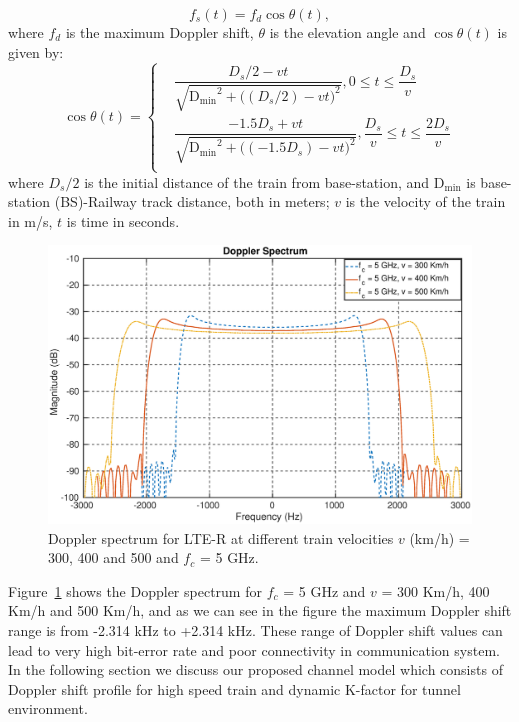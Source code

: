 \begin{equation}
\label{eq1}
f_s(t) = f_d\cos\theta(t),
\end{equation}
where \textrm{$f_d$} is the maximum Doppler shift, $\theta$ is the elevation angle and $\cos \theta(t)$ is given by:
\begin{equation}
\cos\theta(t) = 
\left\{
	\begin{aligned}
	 & \dfrac{D_s/2-vt}{\sqrt{\mathrm{D_{min}}^2+\bigg((D_s/2)-vt\bigg)^2}},0\leq t\leq\dfrac{D_s}{v}\\
	 & \dfrac{-1.5D_s+vt}{\sqrt{\mathrm{D_{min}}^2+\bigg((-1.5D_s)-vt\bigg)^2}},\dfrac{D_s}{v}\leq t \leq \dfrac{2D_s}{v}\\
 	\end{aligned}
\right.
\end{equation}
where $D_s/2$ is the initial distance of the train from base-station, and $\mathrm{D_{min}}$ is base-station (BS)-Railway track distance, both in meters; $v$ is the velocity of the train in \textrm{m/s}, $t$ is time in seconds.

\begin{figure}[!ht]
\centering
\includegraphics[width=\textwidth,keepaspectratio]{images/Gill/lte_figs/dopplerspectrum.eps} 
\caption{Doppler spectrum for LTE-R at different train velocities $v$ (km/h) = 300, 400 and 500 and $f_c$ = 5 GHz.}
\label{doppler}
\end{figure}

Figure~\ref{doppler} shows the Doppler spectrum for $f_c$ = 5 GHz and $v$ = 300 Km/h, 400 Km/h and 500 Km/h, and as we can see in the figure the maximum Doppler shift range is from -2.314 kHz to +2.314 kHz. These range of Doppler shift values can lead to very high bit-error rate and poor connectivity in communication system. In the following section we discuss our proposed channel model which consists of Doppler shift profile for high speed train and dynamic K-factor for tunnel environment.

